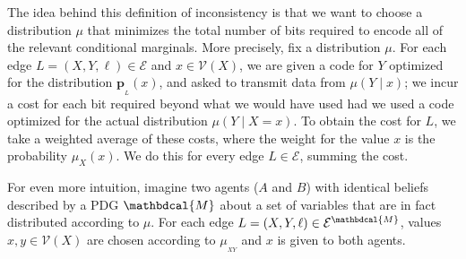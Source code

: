 \documentclass[letterpaper]{article} %
\theoremstyle{plain}
\theoremstyle{definition}
\theoremstyle{remark}
\newcommand\mat[1]{\mathbf{#1}}
\newcommand{\bp}[1][L]{\mat{p}_{\!_{#1}\!}}
\newcommand{\V}{\mathcal V}
\newcommand{\Ed}{\mathcal E}
\newcommand{\dg}[1]{\mathbdcal{#1}}
\begin{document}
\begin{vfull}
The idea behind this definition of inconsistency is that we want to choose a
distribution $\mu$ that minimizes the total number of bits required to encode
all of the relevant conditional marginals. More precisely, fix a distribution
$\mu$. For each edge $L = (X, Y,
\ell) \in \Ed$ and $x \in \V(X)$, we are given a code for $Y$ optimized for the
distribution $\bp(x)$, and asked to transmit
data from $\mu(Y\mid x)$; we incur a cost for each bit required beyond what we
would have used had we used a code optimized for the actual distribution
$\mu(Y\mid X=x)$. To obtain the cost for $L$, we take a weighted average of
these costs, where the weight for the value $x$ is the probability $\mu_X(x)$.
We do this for every edge $L \in \Ed$, summing the cost.

For even more intuition, imagine two agents ($A$ and $B$) with identical beliefs described by a PDG $\dg M$ about a set of variables that are in fact distributed according to $\mu$. For each edge $L = (X,Y, \ell) \in \Ed^\dg M$, values $x,y \in \V(X)$ are chosen according to $\mu_{_{XY}}$ and $x$ is given to both agents. 


\end{vfull}
\end{document}
